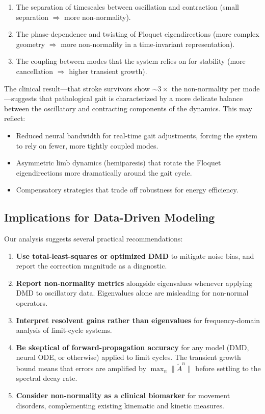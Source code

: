 \documentclass[12pt]{article}
\newcommand{\norm}[1]{\lVert #1 \rVert}
\newcommand{\Atilde}{\tilde{A}}
\begin{document}
\begin{enumerate}[label=(\roman*)]
  \item The separation of timescales between oscillation and contraction
  (small separation $\Rightarrow$ more non-normality).
  \item The phase-dependence and twisting of Floquet eigendirections
  (more complex geometry $\Rightarrow$ more non-normality in a
  time-invariant representation).
  \item The coupling between modes that the system relies on for
  stability (more cancellation $\Rightarrow$ higher transient growth).
\end{enumerate}

The clinical result---that stroke survivors show $\sim 3\times$ the
non-normality per mode---suggests that pathological gait is characterized
by a more delicate balance between the oscillatory and contracting
components of the dynamics. This may reflect:

\begin{itemize}
  \item Reduced neural bandwidth for real-time gait adjustments, forcing
  the system to rely on fewer, more tightly coupled modes.
  \item Asymmetric limb dynamics (hemiparesis) that rotate the Floquet
  eigendirections more dramatically around the gait cycle.
  \item Compensatory strategies that trade off robustness for energy
  efficiency.
\end{itemize}

\subsection{Implications for Data-Driven Modeling}

Our analysis suggests several practical recommendations:

\begin{enumerate}
  \item \textbf{Use total-least-squares or optimized DMD} to mitigate
  noise bias, and report the correction magnitude as a diagnostic.
  \item \textbf{Report non-normality metrics} alongside eigenvalues
  whenever applying DMD to oscillatory data. Eigenvalues alone are
  misleading for non-normal operators.
  \item \textbf{Interpret resolvent gains rather than eigenvalues} for
  frequency-domain analysis of limit-cycle systems.
  \item \textbf{Be skeptical of forward-propagation accuracy} for any
  model (DMD, neural ODE, or otherwise) applied to limit cycles.
  The transient growth bound means that errors are amplified by
  $\max_n \norm{\Atilde^n}$ before settling to the spectral decay rate.
  \item \textbf{Consider non-normality as a clinical biomarker} for
  movement disorders, complementing existing kinematic and kinetic
  measures.
\end{enumerate}
\end{document}
